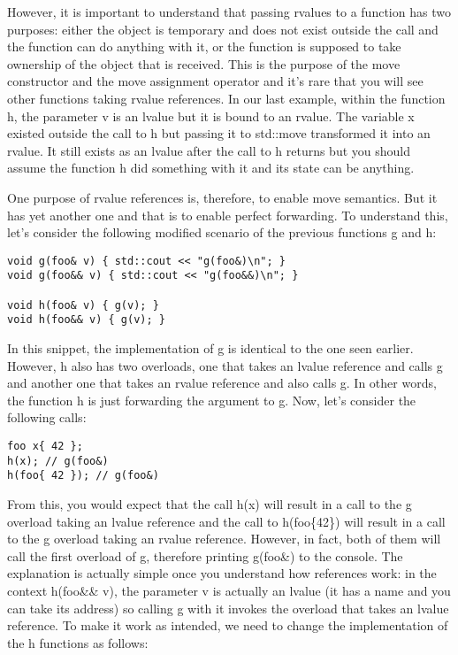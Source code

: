 However, it is important to understand that passing rvalues to a function has two purposes: either the object is temporary and does not exist outside the call and the function can do anything with it, or the function is supposed to take ownership of the object that is received. This is the purpose of the move constructor and the move assignment operator and it’s rare that you will see other functions taking rvalue references. In our last example, within the function h, the parameter v is an lvalue but it is bound to an rvalue. The variable x existed outside the call to h but passing it to std::move transformed it into an rvalue. It still exists as an lvalue after the call to h returns but you should assume the function h did something with it and its state can be anything.

One purpose of rvalue references is, therefore, to enable move semantics. But it has yet another one and that is to enable perfect forwarding. To understand this, let’s consider the following modified scenario of the previous functions g and h:

\begin{lstlisting}[style=styleCXX]
void g(foo& v) { std::cout << "g(foo&)\n"; }
void g(foo&& v) { std::cout << "g(foo&&)\n"; }

void h(foo& v) { g(v); }
void h(foo&& v) { g(v); }
\end{lstlisting}

In this snippet, the implementation of g is identical to the one seen earlier. However, h also has two overloads, one that takes an lvalue reference and calls g and another one that takes an rvalue reference and also calls g. In other words, the function h is just forwarding the argument to g. Now, let’s consider the following calls:

\begin{lstlisting}[style=styleCXX]
foo x{ 42 };
h(x); // g(foo&)
h(foo{ 42 }); // g(foo&)
\end{lstlisting}

From this, you would expect that the call h(x) will result in a call to the g overload taking an lvalue reference and the call to h(foo\{42\}) will result in a call to the g overload taking an rvalue reference. However, in fact, both of them will call the first overload of g, therefore printing g(foo\&) to the console. The explanation is actually simple once you understand how references work: in the context h(foo\&\& v), the parameter v is actually an lvalue (it has a name and you can take its address) so calling g with it invokes the overload that takes an lvalue reference. To make it work as intended, we need to change the implementation of the h functions as follows:

